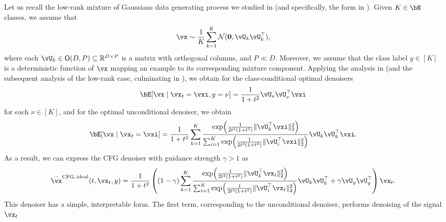 \documentclass[../../book-main.tex]{subfiles}
\begin{document}
\begin{example}\label{example:denoising-gaussian-mixture-cfg}
  Let us recall the low-rank mixture of Gaussians data generating process we studied in
   (and specifically, the form in
  ). Given $K \in \bN$ classes, we assume that
  \begin{equation}\label{eq:MoG1-ch6}
    \vx \sim \frac{1}{K}\sum_{k = 1}^{K}\dNorm(\vzero, \vU_{k}\vU_{k}^{\top}),
  \end{equation}
  where each \(\vU_{k} \in \O(D, P) \subseteq \R^{D \times P}\) is a matrix with
  orthogonal columns, and $P \ll D$.
  Moreover, we assume that the class label $y \in [K]$ is a deterministic
  function of $\vx$ mapping an example to its corresponding mixture component.
  Applying the analysis in  (and the
  subsequent analysis of the low-rank case, culminating in
  ), we obtain for the class-conditional optimal
  denoisers
  \begin{equation}\label{eq:gmm_lowrank_denoiser-ch6-classcond}
    \bE[ \vx \mid \vx_t = \vxi, y = \nu ]
    = \frac{1}{1 + t^{2}}
    \vU_{\nu}\vU_{\nu}^{\top}\vxi
  \end{equation}
  for each $\nu \in [K]$, and for the optimal unconditional denoiser, we obtain
  \begin{equation}\label{eq:gmm_lowrank_denoiser-ch6-uncond}
    \bE[ \vx \mid \vx_t = \vxi ]
    = \frac{1}{1 + t^{2}}\sum_{k = 1}^{K}\frac{\exp\rp{\frac{1}{2t^{2}(1 + t^{2})}\norm{\vU_{k}^{\top}\vxi}_{2}^{2}}}{\sum_{i = 1}^{K}\exp\rp{\frac{1}{2t^{2}(1 + t^{2})}\norm{\vU_{i}^{\top}\vxi}_{2}^{2}}}\vU_{k}\vU_{k}^{\top}\vxi.
  \end{equation}
  As a result, we can express the CFG denoiser with guidance strength $\gamma
  > 1$ as
  \begin{equation}\label{eq:cfg-denoiser-mog-low-rank}
    \bar{\vx}^{\mathrm{CFG,\,ideal}}(t, \vx_t, y)
    =
    \frac{1}{1 + t^{2}}
    \left(
    (1 - \gamma) 
    \sum_{k = 1}^{K}\frac{\exp\rp{\frac{1}{2t^{2}(1
    + t^{2})}\norm{\vU_{k}^{\top}\vx_t}_{2}^{2}}}{\sum_{i
    = 1}^{K}\exp\rp{\frac{1}{2t^{2}(1
    + t^{2})}\norm{\vU_{i}^{\top}\vx_t}_{2}^{2}}}\vU_{k}\vU_{k}^{\top}
    +
    \gamma 
    \vU_{y}\vU_{y}^{\top}
    \right)
    \vx_t.
  \end{equation}
  This denoiser has a simple, interpretable form. The first term, corresponding
  to the unconditional denoiser, performs denoising of the signal $\vx_t$

\end{example}
\end{document}
